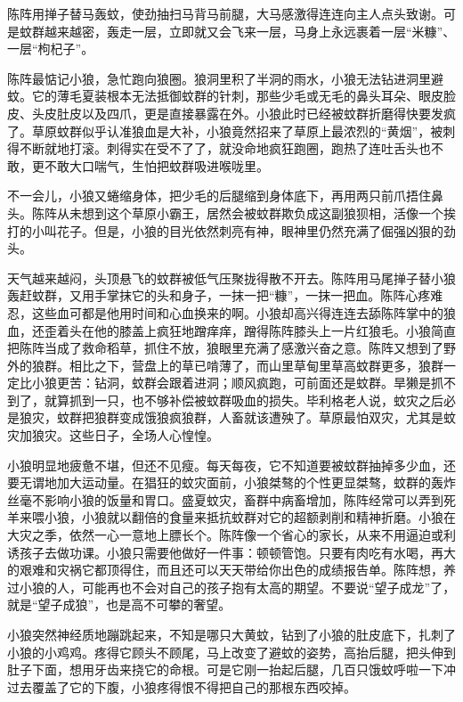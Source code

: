 \par 陈阵用掸子替马轰蚊，使劲抽扫马背马前腿，大马感激得连连向主人点头致谢。可是蚊群越来越密，轰走一层，立即就又会飞来一层，马身上永远裹着一层“米糠”、一层“枸杞子”。
\par 陈阵最惦记小狼，急忙跑向狼圈。狼洞里积了半洞的雨水，小狼无法钻进洞里避蚊。它的薄毛夏装根本无法抵御蚊群的针刺，那些少毛或无毛的鼻头耳朵、眼皮脸皮、头皮肚皮以及四爪，更是直接暴露在外。小狼此时已经被蚊群折磨得快要发疯了。草原蚊群似乎认准狼血是大补，小狼竟然招来了草原上最浓烈的“黄烟”，被刺得不断就地打滚。刺得实在受不了了，就没命地疯狂跑圈，跑热了连吐舌头也不敢，更不敢大口喘气，生怕把蚊群吸进喉咙里。
\par 不一会儿，小狼又蜷缩身体，把少毛的后腿缩到身体底下，再用两只前爪捂住鼻头。陈阵从未想到这个草原小霸王，居然会被蚊群欺负成这副狼狈相，活像一个挨打的小叫花子。但是，小狼的目光依然刺亮有神，眼神里仍然充满了倔强凶狠的劲头。
\par 天气越来越闷，头顶悬飞的蚊群被低气压聚拢得散不开去。陈阵用马尾掸子替小狼轰赶蚊群，又用手掌抹它的头和身子，一抹一把“糠”，一抹一把血。陈阵心疼难忍，这些血可都是他用时间和心血换来的啊。小狼却高兴得连连去舔陈阵掌中的狼血，还歪着头在他的膝盖上疯狂地蹭痒痒，蹭得陈阵膝头上一片红狼毛。小狼简直把陈阵当成了救命稻草，抓住不放，狼眼里充满了感激兴奋之意。陈阵又想到了野外的狼群。相比之下，营盘上的草已啃薄了，而山里草甸里草高蚊群更多，狼群一定比小狼更苦：钻洞，蚊群会跟着进洞；顺风疯跑，可前面还是蚊群。旱獭是抓不到了，就算抓到一只，也不够补偿被蚊群吸血的损失。毕利格老人说，蚊灾之后必是狼灾，蚊群把狼群变成饿狼疯狼群，人畜就该遭殃了。草原最怕双灾，尤其是蚊灾加狼灾。这些日子，全场人心惶惶。
\par 小狼明显地疲惫不堪，但还不见瘦。每天每夜，它不知道要被蚊群抽掉多少血，还要无谓地加大运动量。在猖狂的蚊灾面前，小狼桀骜的个性更显桀骜，蚊群的轰炸丝毫不影响小狼的饭量和胃口。盛夏蚊灾，畜群中病畜增加，陈阵经常可以弄到死羊来喂小狼，小狼就以翻倍的食量来抵抗蚊群对它的超额剥削和精神折磨。小狼在大灾之季，依然一心一意地上膘长个。陈阵像一个省心的家长，从来不用逼迫或利诱孩子去做功课。小狼只需要他做好一件事：顿顿管饱。只要有肉吃有水喝，再大的艰难和灾祸它都顶得住，而且还可以天天带给你出色的成绩报告单。陈阵想，养过小狼的人，可能再也不会对自己的孩子抱有太高的期望。不要说“望子成龙”了，就是“望子成狼”，也是高不可攀的奢望。
\par 小狼突然神经质地蹦跳起来，不知是哪只大黄蚊，钻到了小狼的肚皮底下，扎刺了小狼的小鸡鸡。疼得它顾头不顾尾，马上改变了避蚊的姿势，高抬后腿，把头伸到肚子下面，想用牙齿来挠它的命根。可是它刚一抬起后腿，几百只饿蚊呼啦一下冲过去覆盖了它的下腹，小狼疼得恨不得把自己的那根东西咬掉。
